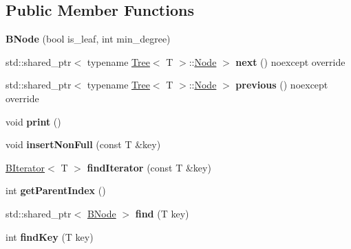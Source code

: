 \subsection*{Public Member Functions}
\begin{DoxyCompactItemize}
\item 
\mbox{\label{classBTree_1_1BNode_a6db3bbcf350e06109f86db08f86fc1d2}} 
{\bfseries B\+Node} (bool is\+\_\+leaf, int min\+\_\+degree)
\item 
\mbox{\label{classBTree_1_1BNode_a8440e89eab5284dc118c00de4e7e619b}} 
std\+::shared\+\_\+ptr$<$ typename \hyperlink{classTree}{Tree}$<$ T $>$\+::\hyperlink{classTree_1_1Node}{Node} $>$ {\bfseries next} () noexcept override
\item 
\mbox{\label{classBTree_1_1BNode_aa3909dab0e45cf56b602705b8720e7c0}} 
std\+::shared\+\_\+ptr$<$ typename \hyperlink{classTree}{Tree}$<$ T $>$\+::\hyperlink{classTree_1_1Node}{Node} $>$ {\bfseries previous} () noexcept override
\item 
\mbox{\label{classBTree_1_1BNode_a8501fb870aca2959c7636bb0ca96424f}} 
void {\bfseries print} ()
\item 
\mbox{\label{classBTree_1_1BNode_a12209859c0d20881dc4197e9c677dfd5}} 
void {\bfseries insert\+Non\+Full} (const T \&key)
\item 
\mbox{\label{classBTree_1_1BNode_a0a8c168d152ef320e62c0283c4db3f26}} 
\hyperlink{classBIterator}{B\+Iterator}$<$ T $>$ {\bfseries find\+Iterator} (const T \&key)
\item 
\mbox{\label{classBTree_1_1BNode_a559e979d22e13c7b455fef771af47049}} 
int {\bfseries get\+Parent\+Index} ()
\item 
\mbox{\label{classBTree_1_1BNode_a646808ce526bbf4b5e5df0348fcca8db}} 
std\+::shared\+\_\+ptr$<$ \hyperlink{classBTree_1_1BNode}{B\+Node} $>$ {\bfseries find} (T key)
\item 
\mbox{\label{classBTree_1_1BNode_a53972c6065afd789a1fdb79fe96d25e9}} 
int {\bfseries find\+Key} (T key)

\end{DoxyCompactItemize}
